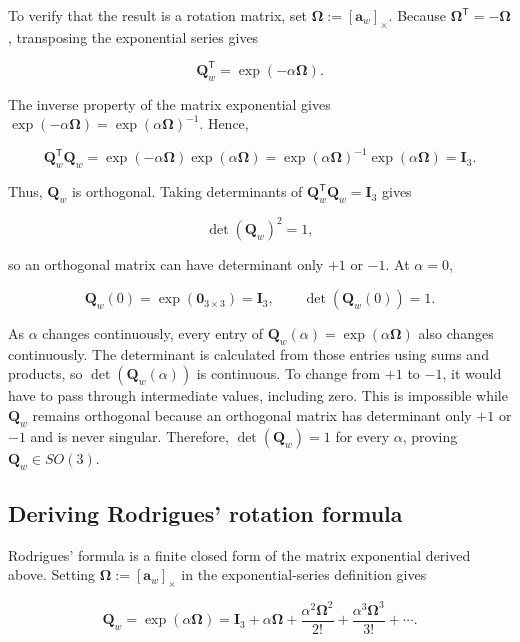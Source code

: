 \documentclass[
  australian,
  12pt,
  letterpaper,
  DIV=11,
  numbers=noendperiod,
  twoside]{scrreprt}
\begin{document}
To verify that the result is a rotation matrix, set
\(\boldsymbol\Omega\mathrel{:=}[\mathbf a_w]_\times\). Because
\(\boldsymbol\Omega^\mathsf T=-\boldsymbol\Omega\), transposing the
exponential series gives

\[
\mathbf Q_w^\mathsf T
=
\exp(-\alpha\boldsymbol\Omega).
\]

The inverse property of the matrix exponential gives
\(\exp(-\alpha\boldsymbol\Omega)=\exp(\alpha\boldsymbol\Omega)^{-1}\).
Hence,

\[
\mathbf Q_w^\mathsf T\mathbf Q_w
=
\exp(-\alpha\boldsymbol\Omega)
\exp(\alpha\boldsymbol\Omega)
=
\exp(\alpha\boldsymbol\Omega)^{-1}
\exp(\alpha\boldsymbol\Omega)
=
\mathbf I_3.
\]

Thus, \(\mathbf Q_w\) is orthogonal. Taking determinants of
\(\mathbf Q_w^\mathsf T\mathbf Q_w=\mathbf I_3\) gives

\[
\det(\mathbf Q_w)^2
=
1,
\]

so an orthogonal matrix can have determinant only \(+1\) or \(-1\). At
\(\alpha=0\),

\[
\mathbf Q_w(0)
=
\exp(\mathbf 0_{3\times3})
=
\mathbf I_3,
\qquad
\det(\mathbf Q_w(0))
=
1.
\]

As \(\alpha\) changes continuously, every entry of
\(\mathbf Q_w(\alpha)=\exp(\alpha\boldsymbol\Omega)\) also changes
continuously. The determinant is calculated from those entries using
sums and products, so \(\det(\mathbf Q_w(\alpha))\) is continuous. To
change from \(+1\) to \(-1\), it would have to pass through intermediate
values, including zero. This is impossible while \(\mathbf Q_w\) remains
orthogonal because an orthogonal matrix has determinant only \(+1\) or
\(-1\) and is never singular. Therefore, \(\det(\mathbf Q_w)=1\) for
every \(\alpha\), proving \(\mathbf Q_w\in SO(3)\).

\subsection{Deriving Rodrigues' rotation
formula}\label{deriving-rodrigues-rotation-formula}

Rodrigues' formula is a finite closed form of the matrix exponential
derived above. Setting
\(\boldsymbol\Omega\mathrel{:=}[\mathbf a_w]_\times\) in the
exponential-series definition gives

\[
\mathbf Q_w
=
\exp(\alpha\boldsymbol\Omega)
=
\mathbf I_3
+
\alpha\boldsymbol\Omega
+
\frac{\alpha^2\boldsymbol\Omega^2}{2!}
+
\frac{\alpha^3\boldsymbol\Omega^3}{3!}
+
\cdots.
\]
\end{document}
